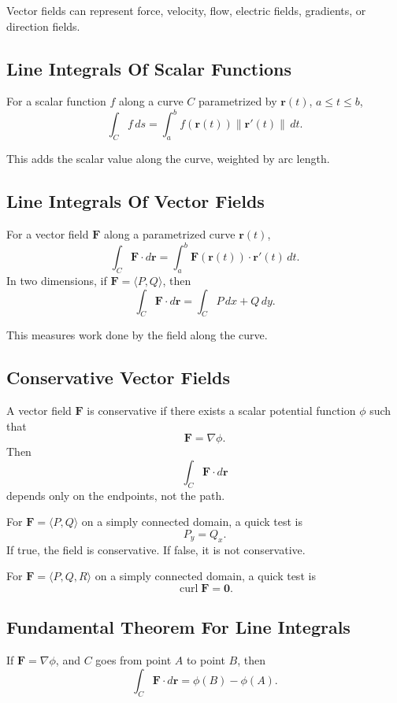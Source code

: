 \documentclass[11pt]{article}
\newcommand{\grad}{\nabla}
\newcommand{\curl}{\operatorname{curl}}
\begin{document}
Vector fields can represent force, velocity, flow, electric fields, gradients, or direction fields.

\subsection{Line Integrals Of Scalar Functions}

For a scalar function $f$ along a curve $C$ parametrized by $\mathbf r(t)$, $a\le t\le b$,
\[
\int_C f\,ds=\int_a^b f(\mathbf r(t))\|\mathbf r'(t)\|\,dt.
\]

This adds the scalar value along the curve, weighted by arc length.

\subsection{Line Integrals Of Vector Fields}

For a vector field $\mathbf F$ along a parametrized curve $\mathbf r(t)$,
\[
\int_C \mathbf F\cdot d\mathbf r
=\int_a^b \mathbf F(\mathbf r(t))\cdot \mathbf r'(t)\,dt.
\]
In two dimensions, if $\mathbf F=\langle P,Q\rangle$, then
\[
\int_C \mathbf F\cdot d\mathbf r
=\int_C P\,dx+Q\,dy.
\]

This measures work done by the field along the curve.

\subsection{Conservative Vector Fields}

A vector field $\mathbf F$ is conservative if there exists a scalar potential function $\phi$ such that
\[
\mathbf F=\grad\phi.
\]
Then
\[
\int_C \mathbf F\cdot d\mathbf r
\]
depends only on the endpoints, not the path.

For $\mathbf F=\langle P,Q\rangle$ on a simply connected domain, a quick test is
\[
P_y=Q_x.
\]
If true, the field is conservative. If false, it is not conservative.

For $\mathbf F=\langle P,Q,R\rangle$ on a simply connected domain, a quick test is
\[
\curl \mathbf F=\mathbf 0.
\]

\subsection{Fundamental Theorem For Line Integrals}

If $\mathbf F=\grad\phi$, and $C$ goes from point $A$ to point $B$, then
\[
\int_C \mathbf F\cdot d\mathbf r=\phi(B)-\phi(A).
\]
\end{document}
